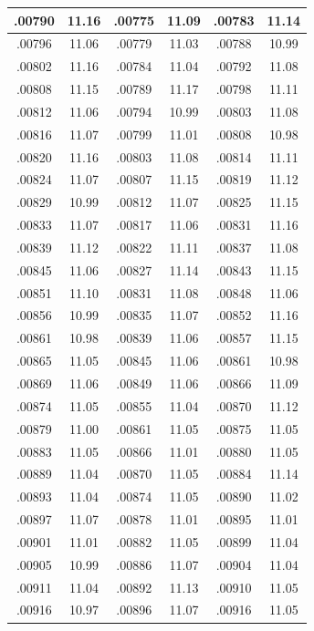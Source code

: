 \documentclass[10pt,twoside]{report}
\begin{document}
\begin{appendices}
\begin{longtable}{|c|c||c|c||c|c|}
.00790 & 11.16 & .00775 & 11.09 & .00783 & 11.14\\\hline
.00796 & 11.06 & .00779 & 11.03 & .00788 & 10.99\\\hline
.00802 & 11.16 & .00784 & 11.04 & .00792 & 11.08\\\hline
.00808 & 11.15 & .00789 & 11.17 & .00798 & 11.11\\\hline
.00812 & 11.06 & .00794 & 10.99 & .00803 & 11.08\\\hline
.00816 & 11.07 & .00799 & 11.01 & .00808 & 10.98\\\hline
.00820 & 11.16 & .00803 & 11.08 & .00814 & 11.11\\\hline
.00824 & 11.07 & .00807 & 11.15 & .00819 & 11.12\\\hline
.00829 & 10.99 & .00812 & 11.07 & .00825 & 11.15\\\hline
.00833 & 11.07 & .00817 & 11.06 & .00831 & 11.16\\\hline
.00839 & 11.12 & .00822 & 11.11 & .00837 & 11.08\\\hline
.00845 & 11.06 & .00827 & 11.14 & .00843 & 11.15\\\hline
.00851 & 11.10 & .00831 & 11.08 & .00848 & 11.06\\\hline
.00856 & 10.99 & .00835 & 11.07 & .00852 & 11.16\\\hline
.00861 & 10.98 & .00839 & 11.06 & .00857 & 11.15\\\hline
.00865 & 11.05 & .00845 & 11.06 & .00861 & 10.98\\\hline
.00869 & 11.06 & .00849 & 11.06 & .00866 & 11.09\\\hline
.00874 & 11.05 & .00855 & 11.04 & .00870 & 11.12\\\hline
.00879 & 11.00 & .00861 & 11.05 & .00875 & 11.05\\\hline
.00883 & 11.05 & .00866 & 11.01 & .00880 & 11.05\\\hline
.00889 & 11.04 & .00870 & 11.05 & .00884 & 11.14\\\hline
.00893 & 11.04 & .00874 & 11.05 & .00890 & 11.02\\\hline
.00897 & 11.07 & .00878 & 11.01 & .00895 & 11.01\\\hline
.00901 & 11.01 & .00882 & 11.05 & .00899 & 11.04\\\hline
.00905 & 10.99 & .00886 & 11.07 & .00904 & 11.04\\\hline
.00911 & 11.04 & .00892 & 11.13 & .00910 & 11.05\\\hline
.00916 & 10.97 & .00896 & 11.07 & .00916 & 11.05\\\hline

\end{longtable}
\end{appendices}
\end{document}
